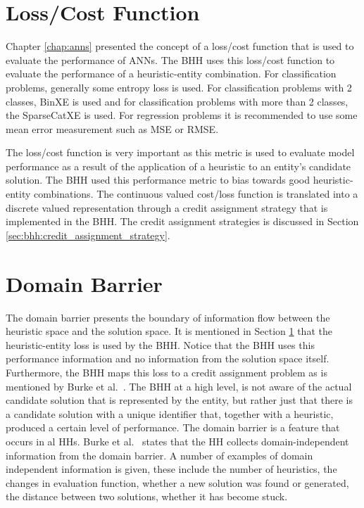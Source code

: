 \section{Loss/Cost Function}
\label{sec:bhh:loss_function}

Chapter \ref{chap:anns} presented the concept of a loss/cost function that is used to evaluate the performance of \acp{ANN}. The \ac{BHH} uses this loss/cost function to evaluate the performance of a heuristic-entity combination. For classification problems, generally some entropy loss is used. For classification problems with 2 classes, \ac{BinXE} is used and for classification problems with more than 2 classes, the \ac{SparseCatXE} is used. For regression problems it is recommended to use some mean error measurement such as \ac{MSE} or \ac{RMSE}.

The loss/cost function is very important as this metric is used to evaluate model performance as a result of the application of a heuristic to an entity's candidate solution. The \ac{BHH} used this performance metric to bias towards good heuristic-entity combinations.  The continuous valued cost/loss function is translated into a discrete valued representation through a credit assignment strategy that is implemented in the \ac{BHH}. The credit assignment strategies is discussed in Section \ref{sec:bhh:credit_assignment_strategy}.

\section{Domain Barrier}
\label{sec:bhh:domain_barrier}

The domain barrier presents the boundary of information flow between the heuristic space and the solution space. It is mentioned in Section \ref{sec:bhh:loss_function} that the heuristic-entity loss is used by the \ac{BHH}. Notice that the \ac{BHH} uses this performance information and no information from the solution space itself. Furthermore, the \ac{BHH} maps this loss to a credit assignment problem as is mentioned by Burke et al.~\cite{ref:burke:2010}. The \ac{BHH} at a high level, is not aware of the actual candidate solution that is represented by the entity, but rather just that there is a candidate solution with a unique identifier that, together with a heuristic, produced a certain level of performance. The domain barrier is a feature that occurs in al \acp{HH}.  Burke et al.~\cite{ref:burke:2010} states that the \ac{HH} collects domain-independent information from the domain barrier. A number of examples of domain independent information is given, these include the number of heuristics, the changes in evaluation function, whether a new solution was found or generated, the distance between two solutions, whether it has become stuck.

